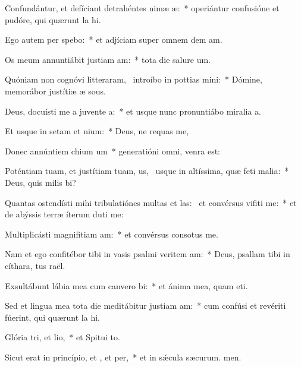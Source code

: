 \item Confundántur, et defíciant detrahéntes nimæ æ:~* operiántur confusióne et pudóre, qui quærunt la hi.
\item Ego autem per spebo:~* et adjíciam super omnem dem am.
\item Os meum annuntiábit justiam am:~* tota die salure um.
\item Quóniam non cognóvi litteraram,~\pscross{} introíbo in pottias mini:~* Dómine, memorábor justítiæ æ sous.
\item Deus, docuísti me a juvente a:~* et usque nunc pronuntiábo miralia a.
\item Et usque in setam et nium:~* Deus, ne requas me,
\item Donec annúntiem chium um~* generatióni omni,  venra est:
\item Poténtiam tuam, et justítiam tuam, us,~\pscross{} usque in altíssima, quæ feti malia:~* Deus, quis milis bi?
\item Quantas ostendísti mihi tribulatiónes multas et las:~\pscross{} et convérsus vifiti me:~* et de abýssis terræ íterum duti me:
\item Multiplicásti magnifitiam am:~* et convérsus consotus  me.
\item Nam et ego confitébor tibi in vasis psalmi veritem am:~* Deus, psallam tibi in cíthara, tus raël.
\item Exsultábunt lábia mea cum canvero bi:~* et ánima mea, quam eti.
\item Sed et lingua mea tota die meditábitur justiam am:~* cum confúsi et revériti fúerint, qui quærunt la hi.
\item Glória tri, et lio,~* et Spitui to.
\item Sicut erat in princípio, et , et per,~* et in sǽcula sæcurum. men.

